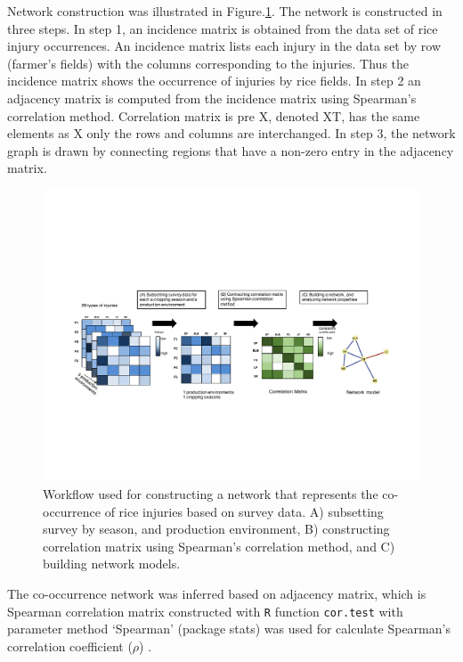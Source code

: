 Network construction was illustrated in Figure.\ref{fig:pipeline2}. The network is constructed in three steps. In step 1, an incidence matrix is obtained from the data set of rice injury occurrences. An incidence matrix lists each injury in the data set by row (farmer's fields) with the columns corresponding to the injuries. Thus the incidence matrix shows the occurrence of injuries by rice fields. In step 2 an adjacency matrix is computed from the incidence matrix using Spearman's correlation method. Correlation matrix is pre X, denoted XT, has the same elements as X only the rows and columns are interchanged. In step 3, the network graph is drawn by connecting regions that have a non-zero entry in the adjacency matrix.

\begin{figure}
\centering
\includegraphics[width = 1\textwidth]{figures/pipeline2.pdf}
\caption[Work flow used for networks construction]{Workflow used for constructing a network that represents the co-occurrence of rice injuries based on survey data. A) subsetting survey by season, and production environment, B) constructing correlation matrix using Spearman's correlation method, and C) building network models.}
\label{fig:pipeline2}
\end{figure} 

The co-occurrence network was inferred based on adjacency matrix, which is Spearman correlation matrix constructed with \texttt{R} function \texttt{cor.test} with parameter method `Spearman' (package stats) was used for calculate Spearman's correlation coefficient ($\rho$) \citep{R_2015}.

